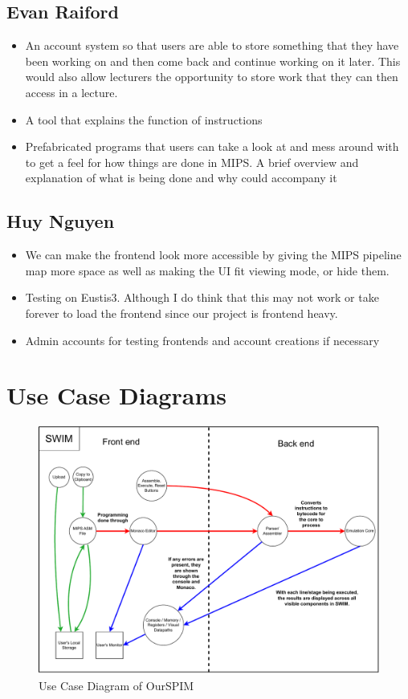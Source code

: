 \documentclass[parskip=half, fontsize=12pt]{scrartcl}
\begin{document}
\subsection{Evan Raiford}
\begin{itemize}
    \item An account system so that users are able to store something that they have been working on and then come back and continue working on it later. This would also allow lecturers the opportunity to store work that they can then access in a lecture.
    \item A tool that explains the function of instructions
    \item Prefabricated programs that users can take a look at and mess around with to get a feel for how things are done in MIPS. A brief overview and explanation of what is being done and why could accompany it 
\end{itemize}


\subsection{Huy Nguyen}
\begin{itemize}
    \item We can make the frontend look more accessible by giving the MIPS pipeline map more space as well as making the UI fit viewing mode, or hide them.
    \item Testing on Eustis3. Although I do think that this may not work or take forever to load the frontend since our project is frontend heavy.
    \item Admin accounts for testing frontends and account creations if necessary
\end{itemize}



\section{Use Case Diagrams}
\begin{figure}[H]
    \centering
    \includegraphics[width=\textwidth]{use-case-diagram}
    \caption{Use Case Diagram of OurSPIM}
\end{figure}
\end{document}
